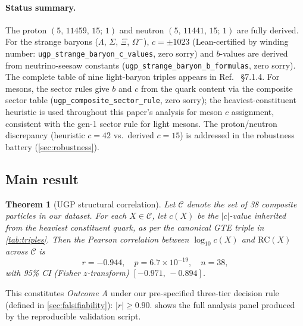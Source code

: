 \documentclass[12pt,a4paper]{article}
\newtheorem{theorem}{Theorem}[section]
\newcommand{\RC}{\ensuremath{\mathrm{RC}}}
\begin{document}
\paragraph{Status summary.}
The proton $(5,\,11459,\,15;\,1)$ and neutron $(5,\,11441,\,15;\,1)$ are
fully derived.
For the strange baryons ($\Lambda$, $\Sigma$, $\Xi$, $\Omega^-$),
$c = \pm 1023$ (Lean-certified by winding number: \texttt{ugp\_strange\_baryon\_c\_values},
zero sorry) and $b$-values are derived from neutrino-seesaw constants
(\texttt{ugp\_strange\_baryon\_b\_formulas}, zero sorry).
The complete table of nine light-baryon triples appears in
Ref.~\cite{Spivack2026_SM_UGP} \S7.1.4.
For mesons, the sector rules give $b$ and $c$ from the quark content
via the composite sector table (\texttt{ugp\_composite\_sector\_rule}, zero sorry);
the heaviest-constituent heuristic is used throughout this paper's analysis
for meson $c$ assignment, consistent with the gen-1 sector rule for light mesons.
The proton/neutron discrepancy (heuristic $c=42$ vs.\ derived $c=15$)
is addressed in the robustness battery (\cref{sec:robustness}).

\subsection{Main result}

\begin{theorem}[UGP structural correlation]
\label{thm:main}
Let $\mathcal{C}$ denote the set of 38 composite particles in our dataset.
For each $X \in \mathcal{C}$, let $c(X)$ be the $|c|$-value inherited from
the heaviest constituent quark, as per the canonical GTE triple in
\cref{tab:triples}.
Then the Pearson correlation between $\log_{10} c(X)$ and $\RC(X)$ across
$\mathcal{C}$ is
\[
  r = -0.944, \quad p = 6.7\times10^{-19}, \quad n = 38,
\]
with 95\% CI (Fisher $z$-transform) $[-0.971,\,-0.894]$.
\end{theorem}

This constitutes \emph{Outcome A} under our pre-specified three-tier decision
rule (defined in \cref{sec:falsifiability}): $|r| \geq 0.90$.
 shows the full analysis panel produced by the reproducible
validation script.
\end{document}
